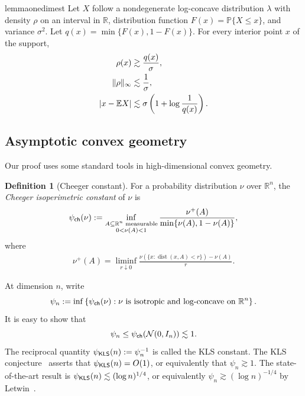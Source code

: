 \documentclass[11pt]{article}
\theoremstyle{definition}
\newtheorem{definition}[theorem]{Definition}
\theoremstyle{remark}
\newcommand{\E}{\mathbb E}
\newcommand{\Prb}{\mathbb P}
\newcommand{\R}{\mathbb R}
\DeclarePairedDelimiter{\abs}{\lvert}{\rvert}
\begin{document}
\begin{restatable}{lemma}{onedimest}\label{lem:one-dimensional-facts}
Let $X$ follow a nondegenerate log-concave distribution $\lambda$ with density $\rho$ on an interval in $\R$, distribution function $F(x)=\Prb\{X\le x\}$, and variance $\sigma^2$. Let $q(x)=\min\{F(x),1-F(x)\}$.  For every interior point $x$ of the
support,
\begin{align}
 \rho(x)&\gtrsim\frac{q(x)}{\sigma},
 \label{eq:quantile-density}\\
 \|\rho\|_\infty&\lesssim\frac1\sigma,
 \label{eq:max-density}\\
 \abs{x-\E X}&\lesssim
 \sigma\left(1+\log\frac1{q(x)}\right).
 \label{eq:quantile-location}
\end{align}
\end{restatable}

\subsection{Asymptotic convex geometry}
Our proof uses some standard tools in high-dimensional convex geometry.
\begin{definition}[Cheeger constant]
For a probability distribution \(\nu\) over $\R^n$, the \emph{Cheeger isoperimetric constant} of $\nu$ is 
\begin{equation}\label{eq:Cheeger}
 \psi_{\sf ch}(\nu):=
 \inf_{\substack{A\subseteq\R^n\text{ measurable}\\0<\nu(A)<1}}
 \frac{
   \nu^+(A)
 }{
   \min\{\nu(A),1-\nu(A)\}
 },
\end{equation}
where 
\begin{align*}
    \nu^+(A)=\liminf_{r\downarrow0}\frac{\nu\left(\{x:
 \operatorname{dist}(x,A)<r\}\right)-\nu(A)}{r}.
\end{align*}
\end{definition}
At dimension \(n\), write
\begin{equation}\label{eq:KLS-constant}
 \psi_n
 :=
 \inf\left\{
 \psi_{\sf ch}(\nu):
 \nu
 \text{ is isotropic and log-concave on }\R^n
 \right\}.
\end{equation}
It is easy to show that
\begin{equation}\label{eq:KLS-upper}
 \psi_n\leq \psi_{\sf ch}(\mathcal{N}(0,I_n))\lesssim 1.
\end{equation}
The reciprocal quantity \(\psi_{\sf KLS}(n):=\psi_n^{-1}\) is called the
KLS constant.  The KLS conjecture~\cite{KLS95} asserts that
\(\psi_{\sf KLS}(n)=O(1)\), or equivalently that \(\psi_n\gtrsim1\). The state-of-the-art result is \(\psi_{\sf KLS}(n)\lesssim(\log n)^{1/4}\),  or equivalently \(\psi_n\gtrsim(\log n)^{-1/4}\) by Letwin~\cite{LetwinKLS}. %
\end{document}

